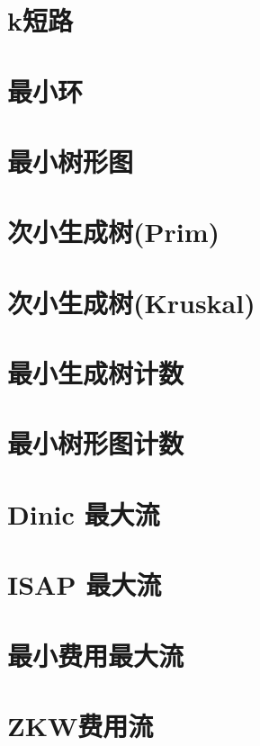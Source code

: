 \section{k短路}
\raggedbottom
\hrulefill
\section{最小环}
\raggedbottom
\hrulefill
\section{最小树形图}
\raggedbottom
\hrulefill
\section{次小生成树(Prim)}
\raggedbottom
\hrulefill
\section{次小生成树(Kruskal)}
\raggedbottom
\hrulefill
\section{最小生成树计数}
\raggedbottom
\hrulefill
\section{最小树形图计数}
\raggedbottom
\hrulefill
\section{Dinic 最大流}
\raggedbottom
\hrulefill
\section{	ISAP 最大流}
\raggedbottom
\hrulefill
\section{最小费用最大流}
\raggedbottom
\hrulefill
\section{ZKW费用流}
\raggedbottom
\hrulefill
